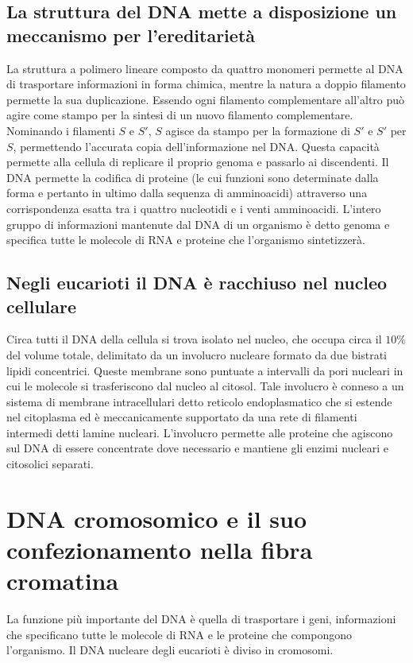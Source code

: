 \subsection{La struttura del DNA mette a disposizione un meccanismo per l'ereditariet\`a}
La struttura a polimero lineare composto da quattro monomeri permette al DNA di trasportare informazioni in forma chimica, mentre la natura a doppio filamento permette la sua 
duplicazione. Essendo ogni filamento complementare all'altro pu\`o agire come stampo per la sintesi di un nuovo filamento complementare. Nominando i filamenti $S$ e $S'$, $S$ agisce
da stampo per la formazione di $S'$ e $S'$ per $S$, permettendo l'accurata copia dell'informazione nel DNA. Questa capacit\`a permette alla cellula di replicare il proprio genoma
e passarlo ai discendenti. Il DNA permette la codifica di proteine (le cui funzioni sono determinate dalla forma e pertanto in ultimo dalla sequenza di amminoacidi) attraverso una
corrispondenza esatta tra i quattro nucleotidi e i venti amminoacidi. L'intero gruppo di informazioni mantenute dal DNA di un organismo \`e detto genoma e specifica tutte le molecole
di RNA e proteine che l'organismo sintetizzer\`a. 
\subsection{Negli eucarioti il DNA \`e racchiuso nel nucleo cellulare}
Circa tutti il DNA della cellula si trova isolato nel nucleo, che occupa circa il $10\%$ del volume totale, delimitato da un involucro nucleare formato da due bistrati lipidi 
concentrici. Queste membrane sono puntuate a intervalli da pori nucleari in cui le molecole si trasferiscono dal nucleo al citosol. Tale involucro \`e conneso a un sistema di 
membrane intracellulari detto reticolo endoplasmatico che si estende nel citoplasma ed \`e meccanicamente supportato da una rete di filamenti intermedi detti lamine nucleari. L'involucro
permette alle proteine che agiscono sul DNA di essere concentrate dove necessario e mantiene gli enzimi nucleari e citosolici separati. 
\section{DNA cromosomico e il suo confezionamento nella fibra cromatina}
La funzione pi\`u importante del DNA \`e quella di trasportare i geni, informazioni che specificano tutte le molecole di RNA e le proteine che compongono l'organismo. Il DNA nucleare 
degli eucarioti \`e diviso in cromosomi. 
